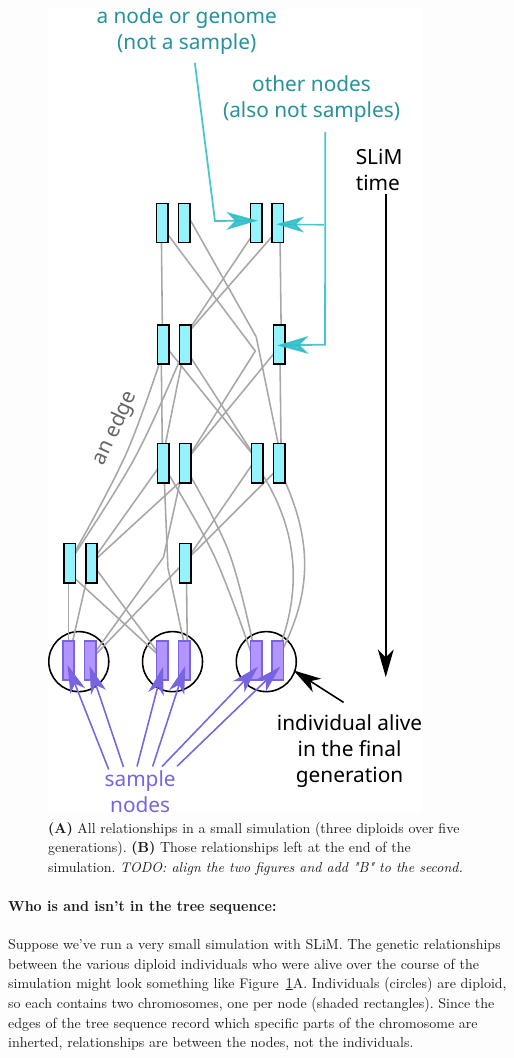 \documentclass[12pt]{article}
\newcommand{\comment}[1]{\textit{\color{green} #1}}
\begin{document}
\begin{figure}
    \includegraphics{figures/pedigree2}
\caption{
    \textbf{(A)} All relationships in a small simulation
    (three diploids over five generations).
    \textbf{(B)} Those relationships left at the end of the simulation.
    \comment{TODO: align the two figures and add "B" to the second.}
}
\label{fig:indivs}
\end{figure}

\paragraph{Who is and isn't in the tree sequence:}
Suppose we've run a very small simulation with SLiM.
The genetic relationships between
the various diploid individuals who were alive over the course of the simulation might
look something like Figure~\ref{fig:indivs}A.
Individuals (circles) are diploid,
so each contains two chromosomes, one per node (shaded rectangles).
Since the edges of the tree sequence record
which specific parts of the chromosome are inherted,
relationships are between the nodes, not the individuals.
\end{document}
